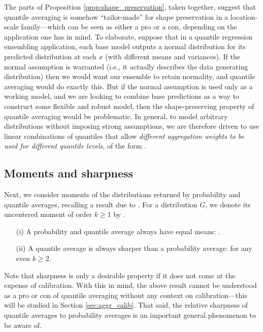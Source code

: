 \documentclass{article}
\begin{document}
The parts of Proposition \ref{prop:shape_preservation}, taken together, suggest
that quantile averaging is somehow ``tailor-made'' for shape preservation in a
location-scale family---which can be seen as either a pro or a con, depending on
the application one has in mind. To elaborate, suppose that in a quantile
regression ensembling application, each base model outputs a normal distribution
for its predicted distribution at each $x$ (with different means and
variances). If the normal assumption is warranted (i.e., it actually describes
the data generating distribution) then we would want our ensemble to retain 
normality, and quantile averaging would do exactly this. But if the normal
assumption is used only as a working model, and we are looking to combine base
predictions as a way to construct some flexible and robust model, then the
shape-preserving property of quantile averaging would be problematic. In
general, to model arbitrary distributions without imposing strong assumptions,
we are therefore driven to use linear combinations of quantiles that allow 
\emph{different aggregation weights to be used for different quantile levels}, 
of the form . 

\subsection{Moments and sharpness}

Next, we consider moments of the distributions returned by probability and
quantile averages, recalling a result due to \citet{lichtendahl2013better}. For
a distribution $G$, we denote its uncentered moment of order $k \geq 1$ by 
.  

\begin{proposition}
\label{prop:moments_sharpness} \hfill
\begin{itemize}
\item[(i)] A probability and quantile average always have equal means:
  .  
\item[(ii)] A quantile average is always sharper than a probability average:
   for any even $k \geq 2$.   
\end{itemize}
\end{proposition}

Note that sharpness is only a desirable property if it does not come at the
expense of calibration. With this in mind, the above result cannot be understood
as a pro or con of quantile averaging without any context on calibration---this
will be studied in Section \ref{sec:aggr_calib}. That said, the relative
sharpness of quantile averages to probability averages is an important general
phenomenon to be aware of.  
\end{document}
